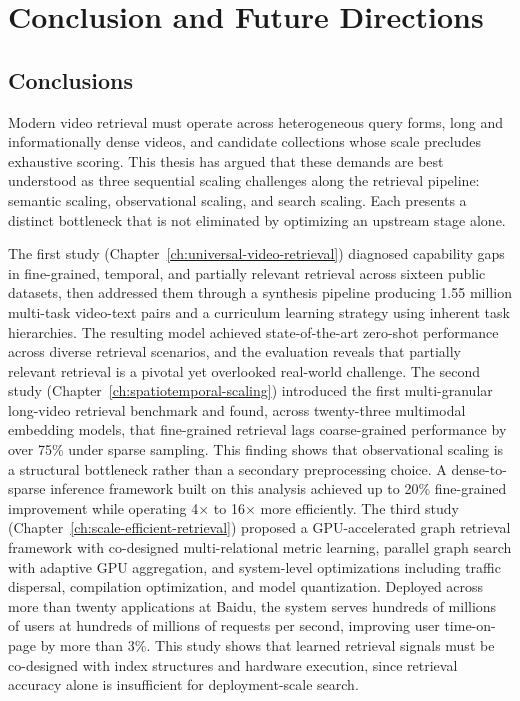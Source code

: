 \chapter{Conclusion and Future Directions}
\label{ch:conclusion}

\section{Conclusions}
\label{sec:conclusions}

Modern video retrieval must operate across heterogeneous query forms, long and informationally dense videos, and candidate collections whose scale precludes exhaustive scoring. This thesis has argued that these demands are best understood as three sequential scaling challenges along the retrieval pipeline: semantic scaling, observational scaling, and search scaling. Each presents a distinct bottleneck that is not eliminated by optimizing an upstream stage alone.

The first study (Chapter~\ref{ch:universal-video-retrieval}) diagnosed capability gaps in fine-grained, temporal, and partially relevant retrieval across sixteen public datasets, then addressed them through a synthesis pipeline producing 1.55 million multi-task video-text pairs and a curriculum learning strategy using inherent task hierarchies. The resulting model achieved state-of-the-art zero-shot performance across diverse retrieval scenarios, and the evaluation reveals that partially relevant retrieval is a pivotal yet overlooked real-world challenge. The second study (Chapter~\ref{ch:spatiotemporal-scaling}) introduced the first multi-granular long-video retrieval benchmark and found, across twenty-three multimodal embedding models, that fine-grained retrieval lags coarse-grained performance by over 75\% under sparse sampling. This finding shows that observational scaling is a structural bottleneck rather than a secondary preprocessing choice. A dense-to-sparse inference framework built on this analysis achieved up to 20\% fine-grained improvement while operating 4$\times$ to 16$\times$ more efficiently. The third study (Chapter~\ref{ch:scale-efficient-retrieval}) proposed a GPU-accelerated graph retrieval framework with co-designed multi-relational metric learning, parallel graph search with adaptive GPU aggregation, and system-level optimizations including traffic dispersal, compilation optimization, and model quantization. Deployed across more than twenty applications at Baidu, the system serves hundreds of millions of users at hundreds of millions of requests per second, improving user time-on-page by more than 3\%. This study shows that learned retrieval signals must be co-designed with index structures and hardware execution, since retrieval accuracy alone is insufficient for deployment-scale search.

